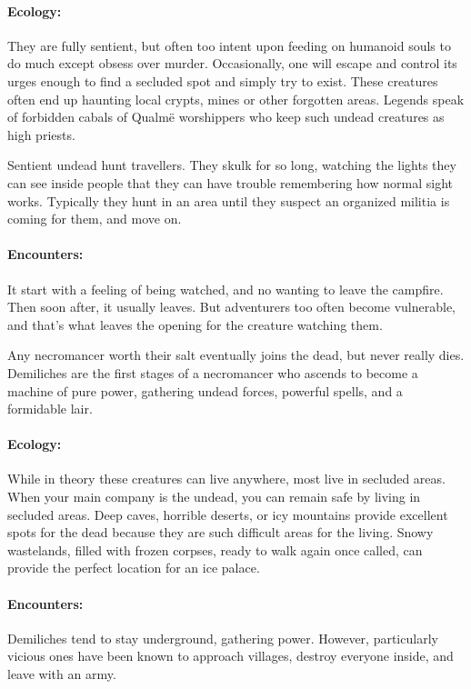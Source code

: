 \begin{multicols}{2}

\paragraph{Ecology:} They are fully sentient, but often too intent upon feeding on humanoid souls to do much except obsess over murder.
Occasionally, one will escape and control its urges enough to find a secluded spot and simply try to exist.
These creatures often end up haunting local crypts, mines or other forgotten areas.
Legends speak of forbidden cabals of Qualm\"{e} worshippers who keep such undead creatures as high priests.

Sentient undead hunt travellers.  They skulk for so long, watching the lights they can see inside people that they can have trouble remembering how normal sight works.  Typically they hunt in an area until they suspect an organized militia is coming for them, and move on.

\paragraph{Encounters:}  It start with a feeling of being watched, and no wanting to leave the campfire.  Then soon after, it usually leaves.  But adventurers too often become vulnerable, and that's what leaves the opening for the creature watching them.


\label{demilich}

Any necromancer worth their salt eventually joins the dead, but never really dies.  Demiliches are the first stages of a necromancer who ascends to become a machine of pure power, gathering undead forces, powerful spells, and a formidable lair.

\paragraph{Ecology:} While in theory these creatures can live anywhere, most live in secluded areas.  When your main company is the undead, you can remain safe by living in secluded areas.  Deep caves, horrible deserts, or icy mountains provide excellent spots for the dead because they are such difficult areas for the living.  Snowy wastelands, filled with frozen corpses, ready to walk again once called, can provide the perfect location for an ice palace.

\paragraph{Encounters:} Demiliches tend to stay underground, gathering power.
However, particularly vicious ones have been known to approach villages, destroy everyone inside, and leave with an army.

\demilich

\end{multicols}

